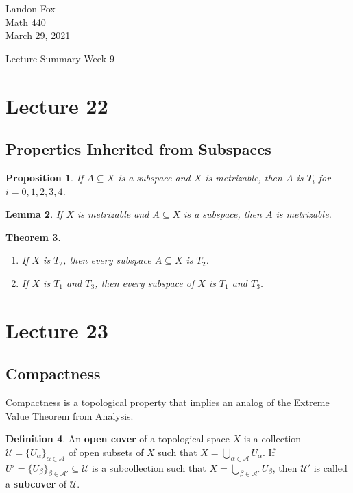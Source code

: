 \documentclass[ 12pt ]{article}
\newcounter{lecture_num}
\theoremstyle{plain}
\theoremstyle{plain}
\newtheorem{theorem}{Theorem}[lecture_num]
\newtheorem{proposition}[theorem]{Proposition}
\newtheorem{lemma}[theorem]{Lemma}
\theoremstyle{definition}
\newtheorem{definition}[theorem]{Definition}
\theoremstyle{remark}
\begin{document}
\noindent Landon Fox \\
\noindent Math 440 \\
\noindent March 29, 2021

\begin{center}
	\Large Lecture Summary Week 9
\end{center}

\setcounter{lecture_num}{22}
\setcounter{theorem}{0}
\section*{Lecture 22}

\subsection*{Properties Inherited from Subspaces}

\begin{proposition}
	If $A \subseteq X$ is a subspace and $X$ is metrizable, then $A$ is $T_i$ for $i = 0, 1, 2, 3, 4$.
\end{proposition}

\begin{lemma}
	If $X$ is metrizable and $A \subseteq X$ is a subspace, then $A$ is metrizable.
\end{lemma}

\begin{theorem} $ $
	\begin{enumerate}
		\item If $X$ is $T_2$, then every subspace $A \subseteq X$ is $T_2$.
		\item If $X$ is $T_1$ and $T_3$, then every subspace of $X$ is $T_1$ and $T_3$.
	\end{enumerate}
\end{theorem}

\setcounter{lecture_num}{23}
\setcounter{theorem}{0}
\section*{Lecture 23}

\subsection*{Compactness}

Compactness is a topological property that implies an analog of the Extreme Value Theorem from Analysis.

\begin{definition}
	An \textbf{open cover} of a topological space $X$ is a collection $\mathcal{U} = \{ U_\alpha \}_{\alpha \in \mathcal{A}}$ of open subsets of $X$ such that $X = \bigcup_{\alpha \in
	\mathcal{A}} U_\alpha$. If $U' = \{ U_\beta \}_{\beta \in \mathcal{A}'} \subseteq \mathcal{U}$ is a subcollection such that $X = \bigcup_{\beta \in \mathcal{A}'} U_\beta$, then
	$\mathcal{U}'$ is called a \textbf{subcover} of $\mathcal{U}$.
\end{definition}
\end{document}

